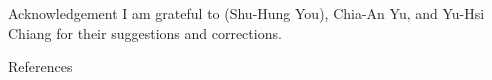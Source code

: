 \begin{frame}{Acknowledgement}
  I am grateful to  (Shu-Hung You), Chia-An Yu, and Yu-Hsi Chiang for their
  suggestions and corrections.
\end{frame}

\begin{frame}[allowframebreaks]{References}


 

\end{frame}



